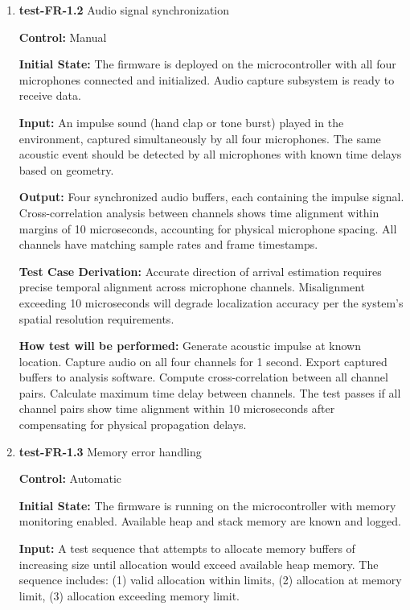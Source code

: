 \documentclass[12pt, titlepage]{article}
\begin{document}
\begin{enumerate}
\item{\textbf{test-FR-1.2} Audio signal synchronization\\}

\textbf{Control:} Manual
					
\textbf{Initial State:} 
The firmware is deployed on the microcontroller with all four microphones 
connected and initialized. Audio capture subsystem is ready to receive data.
					
\textbf{Input:}
An impulse sound (hand clap or tone burst) played in the environment, captured 
simultaneously by all four microphones. The same acoustic event should be 
detected by all microphones with known time delays based on geometry.
					
\textbf{Output:}
Four synchronized audio buffers, each containing the impulse signal. 
Cross-correlation analysis between channels shows time alignment within 
margins of 10 microseconds, accounting for physical microphone spacing. 
All channels have matching sample rates and frame timestamps.

\textbf{Test Case Derivation:} 
Accurate direction of arrival estimation requires precise temporal alignment 
across microphone channels. Misalignment exceeding 10 
microseconds will degrade localization accuracy per the system's spatial 
resolution requirements.
					
\textbf{How test will be performed:}
Generate acoustic impulse at known location. Capture audio on all four channels 
for 1 second. Export captured buffers to analysis software. Compute cross-correlation 
between all channel pairs. Calculate maximum time delay between channels. The 
test passes if all channel pairs show time alignment within 10 microseconds after 
compensating for physical propagation delays.

\item{\textbf{test-FR-1.3} Memory error handling\\}

\textbf{Control:} Automatic
					
\textbf{Initial State:} 
The firmware is running on the microcontroller with memory monitoring enabled. 
Available heap and stack memory are known and logged.
					
\textbf{Input:}
A test sequence that attempts to allocate memory buffers of increasing size 
until allocation would exceed available heap memory. The sequence includes: 
(1) valid allocation within limits, (2) allocation at memory limit, (3) 
allocation exceeding memory limit.
					

\end{enumerate}
\end{document}
